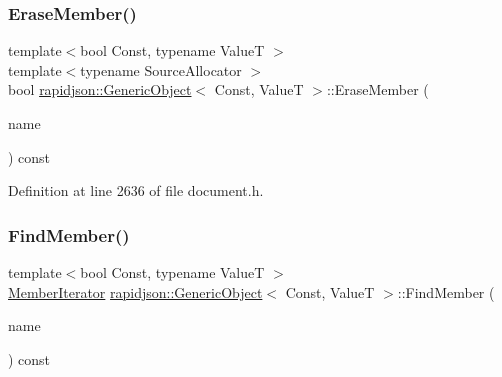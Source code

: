 \subsubsection{\texorpdfstring{EraseMember()}{EraseMember()}\hspace{0.1cm}{\footnotesize\ttfamily [4/4]}}
{\footnotesize\ttfamily template$<$bool Const, typename ValueT $>$ \\
template$<$typename Source\+Allocator $>$ \\
bool \mbox{\hyperlink{classrapidjson_1_1_generic_object}{rapidjson\+::\+Generic\+Object}}$<$ Const, ValueT $>$\+::Erase\+Member (\begin{DoxyParamCaption}\item[{\mbox{\hyperlink{classrapidjson_1_1_generic_object_a3524fcb5f36c034aabd8afa19fc16d9e}{const}} \mbox{\hyperlink{classrapidjson_1_1_generic_value}{Generic\+Value}}$<$ \mbox{\hyperlink{classrapidjson_1_1_generic_object_ac412c8d073aa02f622b3904e4195425c}{Encoding\+Type}}, Source\+Allocator $>$ \&}]{name }\end{DoxyParamCaption}) const}



Definition at line 2636 of file document.\+h.


\begin{DoxyCode}{0}

\end{DoxyCode}
\mbox{\label{classrapidjson_1_1_generic_object_afaa41ea8c0ed91b7e064d31f6a6ab9ef}} 
\subsubsection{\texorpdfstring{FindMember()}{FindMember()}\hspace{0.1cm}{\footnotesize\ttfamily [1/2]}}
{\footnotesize\ttfamily template$<$bool Const, typename ValueT $>$ \\
\mbox{\hyperlink{classrapidjson_1_1_generic_object_a598fd1d5f55289eca275847f0e8ef295}{Member\+Iterator}} \mbox{\hyperlink{classrapidjson_1_1_generic_object}{rapidjson\+::\+Generic\+Object}}$<$ Const, ValueT $>$\+::Find\+Member (\begin{DoxyParamCaption}\item[{\mbox{\hyperlink{classrapidjson_1_1_generic_object_a3524fcb5f36c034aabd8afa19fc16d9e}{const}} \mbox{\hyperlink{classrapidjson_1_1_generic_object_a947f543afbdd5e6d1c5b2dd1fe5a6e60}{Ch}} $\ast$}]{name }\end{DoxyParamCaption}) const}



